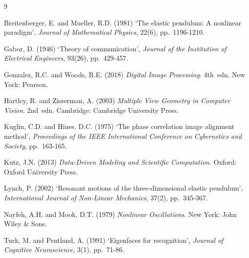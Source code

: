 \documentclass[12pt,a4paper]{article}
\begin{document}
\newpage
\begin{thebibliography}{9}

Breitenberger, E. and Mueller, R.D. (1981) `The elastic pendulum: A nonlinear paradigm', \textit{Journal of Mathematical Physics}, 22(6), pp.~1196-1210.

Gabor, D. (1946) `Theory of communication', \textit{Journal of the Institution of Electrical Engineers}, 93(26), pp.~429-457.

Gonzalez, R.C. and Woods, R.E. (2018) \textit{Digital Image Processing}. 4th~edn. New York: Pearson.

Hartley, R. and Zisserman, A. (2003) \textit{Multiple View Geometry in Computer Vision}. 2nd~edn. Cambridge: Cambridge University Press.

Kuglin, C.D. and Hines, D.C. (1975) `The phase correlation image alignment method', \textit{Proceedings of the IEEE International Conference on Cybernetics and Society}, pp.~163-165.

Kutz, J.N. (2013) \textit{Data-Driven Modeling and Scientific Computation}. Oxford: Oxford University Press.

Lynch, P. (2002) `Resonant motions of the three-dimensional elastic pendulum', \textit{International Journal of Non-Linear Mechanics}, 37(2), pp.~345-367.

Nayfeh, A.H. and Mook, D.T. (1979) \textit{Nonlinear Oscillations}. New York: John Wiley \& Sons.

Turk, M. and Pentland, A. (1991) `Eigenfaces for recognition', \textit{Journal of Cognitive Neuroscience}, 3(1), pp.~71-86.

\end{thebibliography}
\end{document}
